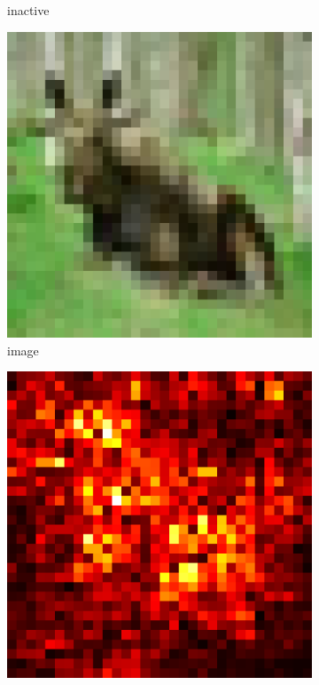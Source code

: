 \documentclass[preprint,12pt]{elsarticle}
\begin{document}
\begin{figure}
\begin{subfigure}{0.14\textwidth}
        \caption{inactive}
    \end{subfigure}
    \hfill
    \begin{subfigure}{0.14\linewidth}
    \centering
    \includegraphics[width=\linewidth]{../visualizations/examples/cifar10/cnn/images/4.png}
    \caption{image}
    \end{subfigure}
    \hfill
    \begin{subfigure}{0.14\linewidth}
        \centering
        \includegraphics[width=\linewidth]{../visualizations/examples/cifar10/cnn/saliency_map/4.png}

\end{subfigure}
\end{figure}
\end{document}

